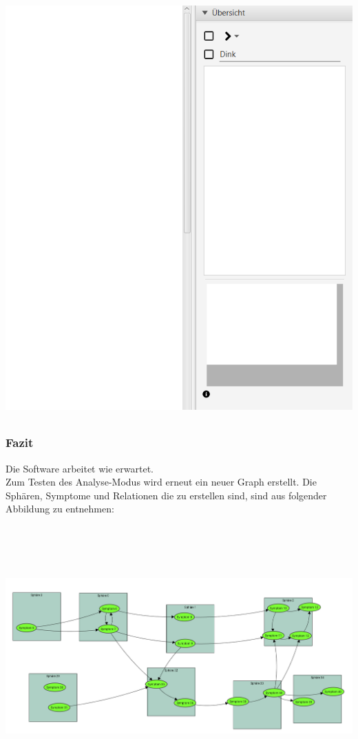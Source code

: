 \documentclass[enabledeprecatedfontcommands]{scrartcl}
\begin{document}
\begin{center}
\includegraphics[height=16cm]{sphareMitRechsklickLoeschen.PNG}
\end{center}
\subsubsection{Fazit}
Die Software arbeitet wie erwartet. \\

Zum Testen des Analyse-Modus wird erneut ein neuer Graph erstellt. Die Sphären, Symptome und Relationen die zu erstellen sind, sind aus folgender Abbildung zu entnehmen: 
\begin{center}
\includegraphics[height=10cm, angle=90]{analysezuErstellenderGraph.PNG}
\end{center}
\end{document}
